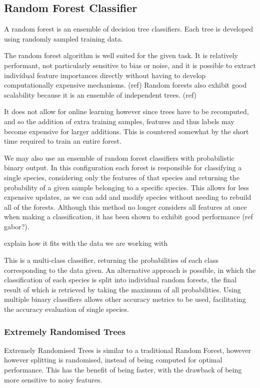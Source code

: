\subsection{Random Forest Classifier}
A random forest is an ensemble of decision tree classifiers.
Each tree is developed using randomly sampled training data.

The random forest algorithm is well suited for the given task.
It is relatively performant, not particularly sensitive to bias or noise,
and it is possible to extract individual feature importances directly without
having to develop computationally expensive mechanisms. (ref)
Random forests also exhibit good scalability because it is an ensemble of
independent trees. (ref)

It does not allow for online learning however since trees have to be recomputed, 
and so the addition of extra training samples, features and thus labels may
become expensive for larger additions.
This is countered somewhat by the short time required to train an entire forest.

We may also use an ensemble of random forest classifiers with probabilistic
binary output.
In this configuration each forest is responsible for classifying a single
species, considering only the features of that species and returning the
probability of a given sample belonging to a specific species.
This allows for less expensive updates, as we can add and modify species without
needing to rebuild all of the forests.
Although this method no longer considers all features at once when making a
classification, it has been shown to exhibit good performance (ref gabor?).


explain how it fits with the data we are working with

This is a multi-class classifier, returning the probabilities of each class
corresponding to the data given.
An alternative approach is possible, in which the classification of each species
is split into individual random forests, the final result of which is retrieved
by taking the maximum of all probabilities.
Using multiple binary classifiers allows other accuracy metrics to be used,
facilitating the accuracy evaluation of single species.

\subsubsection{Extremely Randomised Trees}
Extremely Randomised Trees is similar to a traditional Random Forest, however
however splitting is randomised, instead of being computed for optimal
performance.
This has the benefit of being faster, with the drawback of being more sensitive
to noisy features.\\

